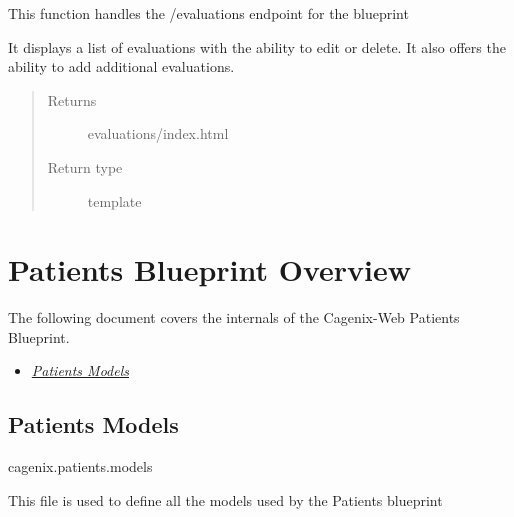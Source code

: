 \documentclass[letterpaper,10pt,english]{sphinxmanual}
\begin{document}
\begin{fulllineitems}
\label{dev-evaluations:cagenix.evaluations.views.home}
This function handles the /evaluations endpoint for the blueprint

It displays a list of evaluations with the ability to edit or
delete. It also offers the ability to add additional evaluations.
\begin{quote}\begin{description}
\item[{Returns}] \leavevmode
evaluations/index.html

\item[{Return type}] \leavevmode
template

\end{description}\end{quote}

\end{fulllineitems}



\chapter{Patients Blueprint Overview}
\label{dev-patients::doc}\label{dev-patients:patients-blueprint-overview}
The following document covers the internals of the Cagenix-Web Patients
Blueprint.
\begin{itemize}
\item {} 
{\hyperref[dev-patients:patients-models-label]{\emph{Patients Models}}}

\end{itemize}


\section{Patients Models}
\label{dev-patients:patients-models-label}\label{dev-patients:patients-models}\label{dev-patients:module-cagenix.patients.models}
cagenix.patients.models

This file is used to define all the models used by the Patients blueprint
\end{document}
